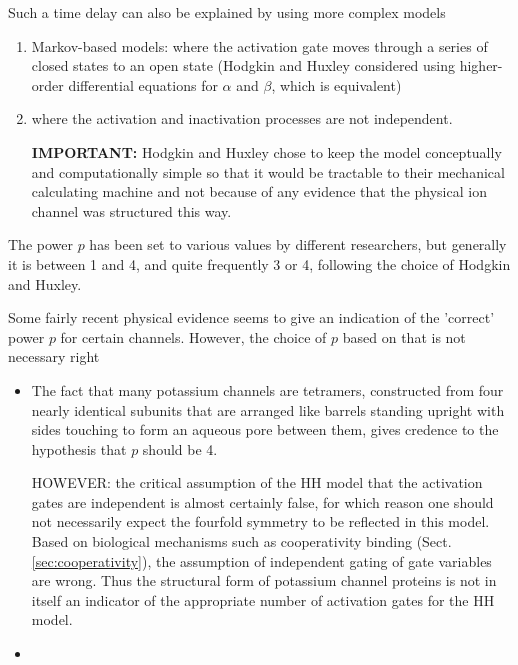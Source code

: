 Such a time delay can also be explained by using more complex models
\begin{enumerate}

  \item Markov-based models:  where the activation gate moves through a series
  of closed states to an open state (Hodgkin and Huxley considered using
  higher-order differential equations for $\alpha$ and $\beta$, which is equivalent)

  \item  where the activation and inactivation processes are not independent.

{\bf IMPORTANT:} Hodgkin and Huxley chose to keep the model conceptually and
computationally simple so that it would be tractable to their mechanical
calculating machine and not because of any evidence that the physical ion
channel was structured this way.

\end{enumerate}

The power $p$ has been set to various values by different researchers, but
generally it is between 1 and 4, and quite frequently 3 or 4, following the
choice of Hodgkin and Huxley.

Some fairly recent physical evidence seems to give an indication of the
'correct' power $p$ for certain channels. However, the choice of $p$
based on that is not necessary right
\begin{itemize}

  \item The fact that many potassium channels are tetramers, constructed from
  four nearly identical subunits that are arranged like barrels standing upright
  with sides touching to form an aqueous pore between them, gives credence to
  the hypothesis that $p$ should be 4.

HOWEVER: the critical assumption of the HH model that the activation gates are
independent is almost certainly false, for which reason one should not
necessarily expect the fourfold symmetry to be reflected in this model. Based on
biological mechanisms such as cooperativity binding
(Sect.\ref{sec:cooperativity}), the assumption of independent gating of gate
variables are wrong. Thus the structural form of potassium channel proteins is
not in itself an indicator of the appropriate number of activation gates for the
HH model.

  \item
\end{itemize}

